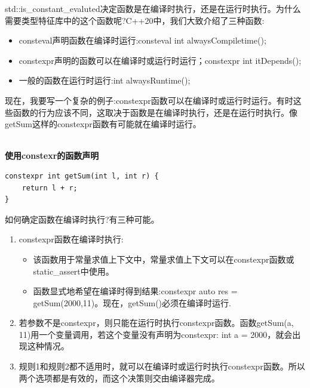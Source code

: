 
std::is\_constant\_evaluted决定函数是在编译时执行，还是在运行时执行。为什么需要类型特征库中的这个函数呢?C++20中，我们大致介绍了三种函数:

\begin{itemize}
\item 
consteval声明函数在编译时运行:consteval int alwaysCompiletime();

\item 
constexpr声明的函数可以在编译时或运行时运行；constexpr int itDepends();

\item 
一般的函数在运行时运行:int alwaysRuntime();
\end{itemize}

现在，我要写一个复杂的例子:constexpr函数可以在编译时或运行时运行。有时这些函数的行为应该不同，这取决于函数是在编译时执行，还是在运行时执行。像getSum这样的constexpr函数有可能就在编译时运行。

\hspace*{\fill} \\ %
\noindent
\textbf{使用constexr的函数声明}
\begin{lstlisting}[style=styleCXX]
constexpr int getSum(int l, int r) {
	return l + r;
}
\end{lstlisting}

如何确定函数在编译时执行?有三种可能。

\begin{enumerate}
\item 
constexpr函数在编译时执行:
\begin{itemize}
\item 
该函数用于常量求值上下文中，常量求值上下文可以在constexpr函数或static\_assert中使用。

\item 
函数显式地希望在编译时得到结果:constexpr auto res = getSum(2000,11)。现在，getSum()必须在编译时运行.
\end{itemize}

\item 
若参数不是constexpr，则只能在运行时执行constexpr函数。函数getSum(a, 11)用一个变量调用，若这个变量没有声明为constexpr: int a = 2000，就会出现这种情况。

\item 
规则1和规则2都不适用时，就可以在编译时或运行时执行constexpr函数。所以两个选项都是有效的，而这个决策则交由编译器完成。
\end{enumerate}

